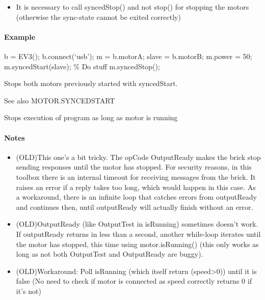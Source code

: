 \documentclass[letterpaper,10pt,english]{sphinxmanual}
\begin{document}
\begin{fulllineitems}
\begin{fulllineitems}
\begin{itemize}
\item {} 
It is necessary to call syncedStop() and not stop() for stopping the motors
(otherwise the sync-state cannot be exited correctly)

\end{itemize}
\paragraph{Example}

b = EV3(); 
b.connect(`usb'); 
m = b.motorA; 
slave = b.motorB; 
m.power = 50; 
m.syncedStart(slave); 
\% Do stuff
m.syncedStop(); 

\end{fulllineitems}


\begin{fulllineitems}
\label{source:source.Motor.syncedStop}
Stops both motors previously started with syncedStart.

See also MOTOR.SYNCEDSTART

\end{fulllineitems}


\begin{fulllineitems}
\label{source:source.Motor.waitFor}
Stops execution of program as long as motor is running
\paragraph{Notes}
\begin{itemize}
\item {} 
(OLD)This one's a bit tricky. The opCode OutputReady makes the brick stop sending
responses until the motor has stopped. For security reasons, in this toolbox
there is an internal timeout for receiving messages from the brick. It raises
an error if a reply takes too long, which would happen in this case. As a
workaround, there is an infinite loop that catches errors from outputReady and
continues then, until outputReady will actually finish without an error.

\item {} 
(OLD)OutputReady (like OutputTest in isRunning) sometimes doesn't work. If
outputReady returns in less than a second, another while-loop iterates until
the motor has stopped, this time using motor.isRunning() (this only works as
long as not both OutputTest and OutputReady are buggy).

\item {} 
(OLD)Workaround: Poll isRunning (which itself return (speed\textgreater{}0)) until it
is false (No need to check if motor is connected as speed correctly
returns 0 if it's not)

\end{itemize}

\end{fulllineitems}


\end{fulllineitems}
\end{document}
